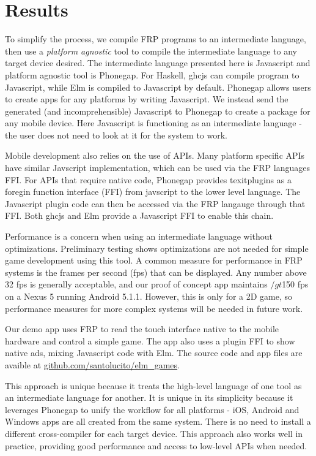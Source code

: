 \documentclass[preprint]{sigplanconf}
\begin{document}
\section{Results}
To simplify the process, we compile FRP programs to an intermediate language, then use a \textit{platform agnostic} tool to compile the intermediate language to any target device desired.
The intermediate language presented here is Javascript and platform agnostic tool is Phonegap.
For Haskell, ghcjs can compile program to Javascript, while Elm is compiled to Javascript by default.
Phonegap allows users to create apps for any platforms by writing Javascript. 
We instead send the generated (and incomprehensible) Javascript to Phonegap to create a package for any mobile device.
Here Javascript is functioning as an intermediate language - the user does not need to look at it for the system to work.

Mobile development also relies on the use of APIs.
Many platform specific APIs have similar Javscript implementation, which can be used via the FRP languages FFI.
For APIs that require native code, Phonegap provides texit{plugins} as a foregin function interface (FFI) from javscript to the lower level language.
The Javascript plugin code can then be accessed via the FRP langauge through that FFI.
Both ghcjs and Elm provide a Javascript FFI to enable this chain. 

Performance is a concern when using an intermediate language without optimizations. 
Preliminary testing shows optimizations are not needed for simple game development using this tool. 
A common measure for performance in FRP systems is the frames per second (fps) that can be displayed.
Any number above 32 fps is generally acceptable, and our proof of concept app maintains $/gt$150 fps on a Nexus 5 running Android 5.1.1.
However, this is only for a 2D game, so performance measures for more complex systems will be needed in future work.

Our demo app uses FRP to read the touch interface native to the mobile hardware and control a simple game.
The app also uses a plugin FFI to show native ads, mixing Javascript code with Elm.
The source code and app files are avaible at \url{github.com/santolucito/elm_games}.

This approach is unique because it treats the high-level language of one tool as an intermediate language for another. 
It is unique in its simplicity because it leverages Phonegap to unify the workflow for all platforms - iOS, Android and Windows apps are all created from the same system.
There is no need to install a different cross-compiler for each target device.
This approach also works well in practice, providing good performance and access to low-level APIs when needed.
 
\end{document}

